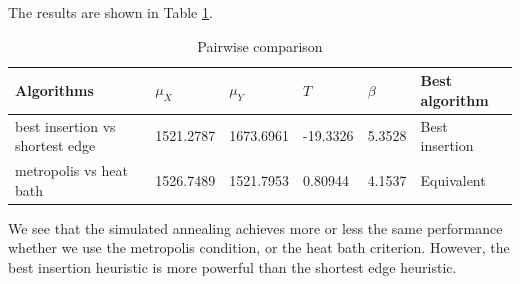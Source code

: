 \documentclass[a4paper, 11pt]{scrartcl}
\begin{document}
The results are shown in Table \ref{table:pairwise-comparison}.

\begin{table}[h]
\centering
\caption{Pairwise comparison}
\label{table:pairwise-comparison}
\begin{tabular}{@{}llllll@{}}
\toprule
Algorithms                      & $\mu_X$     & $\mu_Y$    & $T$        & $\beta$ & Best algorithm\\ \midrule
best insertion vs shortest edge & 1521.2787   & 1673.6961  & -19.3326   & 5.3528   & Best insertion\\
metropolis vs heat bath         & 1526.7489   & 1521.7953  & 0.80944  &  4.1537 & Equivalent  \\ \bottomrule
\end{tabular}
\end{table}

We see that the simulated annealing achieves more or less the same performance whether we use the metropolis
condition, or the heat bath criterion. However, the best insertion heuristic is more powerful than the
shortest edge heuristic. 



	
\end{document}
